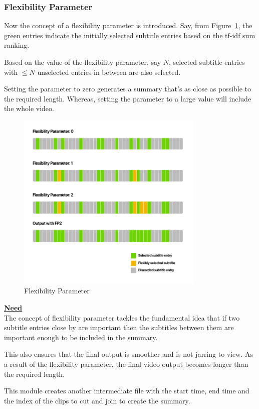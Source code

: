 \documentclass{article}
\begin{document}
			\subsubsection{Flexibility Parameter}
				Now the concept of a flexibility parameter is introduced. Say, from Figure~\ref{flexparam}, the green entries indicate the initially selected subtitle entries based on the tf-idf sum ranking. 
				
				Based on the value of the flexibility parameter, say \(N\), selected subtitle entries with \(\leq N\) unselected entries in between are also selected.
				
				Setting the parameter to zero generates a summary that's as close as possible to the required length. Whereas, setting the parameter to a large value will include the whole video.
				
				\begin{figure}[ht]
				\centering
					\includegraphics[width=0.8\textwidth, keepaspectratio=true]{Flexibility}	
					\caption{Flexibility Parameter}
					\label{flexparam}
				\end{figure}
				\begin{mdframed}
					\textbf{\underline{Need}}\\
						The concept of flexibility parameter tackles the fundamental idea that if two subtitle entries close by are important then the subtitles between them are important enough to be included in the summary.
						
						This also ensures that the final output is smoother and is not jarring to view. As a result of the flexibility parameter, the final video output becomes longer than the required length.
				\end{mdframed}
			This module creates another intermediate file with the start time, end time and the index of the clips to cut and join to create the summary. 
		
\end{document}
